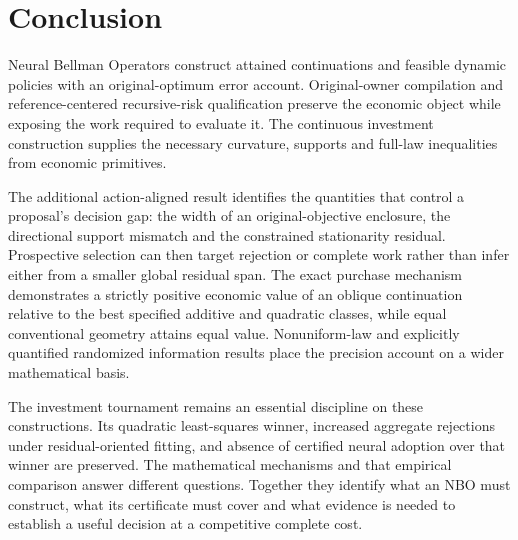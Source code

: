 \section{Conclusion}
Neural Bellman Operators construct attained continuations and feasible dynamic policies with an original-optimum error account. Original-owner compilation and reference-centered recursive-risk qualification preserve the economic object while exposing the work required to evaluate it. The continuous investment construction supplies the necessary curvature, supports and full-law inequalities from economic primitives.

The additional action-aligned result identifies the quantities that control a proposal's decision gap: the width of an original-objective enclosure, the directional support mismatch and the constrained stationarity residual. Prospective selection can then target rejection or complete work rather than infer either from a smaller global residual span. The exact purchase mechanism demonstrates a strictly positive economic value of an oblique continuation relative to the best specified additive and quadratic classes, while equal conventional geometry attains equal value. Nonuniform-law and explicitly quantified randomized information results place the precision account on a wider mathematical basis.

The investment tournament remains an essential discipline on these constructions. Its quadratic least-squares winner, increased aggregate rejections under residual-oriented fitting, and absence of certified neural adoption over that winner are preserved. The mathematical mechanisms and that empirical comparison answer different questions. Together they identify what an NBO must construct, what its certificate must cover and what evidence is needed to establish a useful decision at a competitive complete cost.
